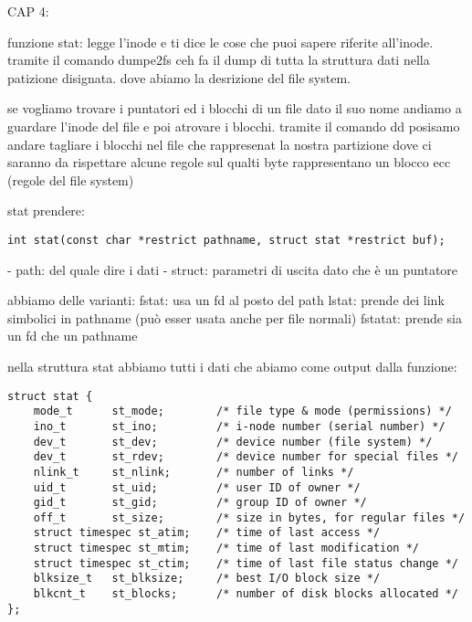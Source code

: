 CAP 4:

funzione stat: legge l'inode e ti dice le cose che puoi sapere riferite all'inode. tramite il comando dumpe2fs ceh fa il dump di tutta la struttura dati nella patizione disignata. dove abiamo la desrizione del file system.

se vogliamo trovare i puntatori ed i blocchi di un file dato il suo nome andiamo a guardare l'inode del file e poi atrovare i blocchi. tramite il comando dd posisamo andare tagliare i blocchi nel file che rappresenat la nostra partizione dove ci saranno da rispettare alcune regole sul qualti byte rappresentano un blocco ecc (regole del file system) 

stat prendere:

\begin{lstlisting}
int stat(const char *restrict pathname, struct stat *restrict buf);
\end{lstlisting}

- path: del quale dire i dati
- struct: parametri di uscita dato che è un puntatore

abbiamo delle varianti:
fstat: usa un fd al posto del path
lstat: prende dei link simbolici in pathname (può esser usata anche per file normali)
fstatat: prende sia un fd che un pathname


nella struttura stat abbiamo tutti i dati che abiamo come output dalla funzione:

\begin{lstlisting}
struct stat {
	mode_t		st_mode;		/* file type & mode (permissions) */
	ino_t		st_ino;			/* i-node number (serial number) */
	dev_t		st_dev;			/* device number (file system) */
	dev_t		st_rdev;		/* device number for special files */
	nlink_t		st_nlink;		/* number of links */
	uid_t		st_uid;			/* user ID of owner */
	gid_t		st_gid;			/* group ID of owner */
	off_t		st_size;		/* size in bytes, for regular files */
	struct timespec st_atim;	/* time of last access */
	struct timespec st_mtim;	/* time of last modification */
	struct timespec st_ctim;	/* time of last file status change */
	blksize_t	st_blksize;		/* best I/O block size */
	blkcnt_t	st_blocks;		/* number of disk blocks allocated */
};
\end{lstlisting}